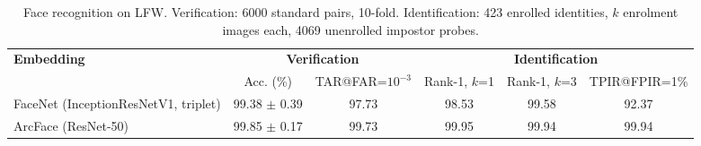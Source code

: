 \begin{table}[H]
\caption{Face recognition on LFW. Verification: 6000 standard pairs, 10-fold. Identification: 423 enrolled identities, $k$ enrolment images each, 4069 unenrolled impostor probes.}
\centering
\label{tab:att_lfw}
\begin{adjustbox}{max width=\textwidth}
\begin{tabular}{lccccc}
\toprule
\multirow{2}{*}{\bf Embedding} & \multicolumn{2}{c}{\bf Verification} & \multicolumn{3}{c}{\bf Identification} \\
\cmidrule(lr){2-3} \cmidrule(lr){4-6}
 & Acc. (\%) & TAR@FAR=$10^{-3}$ & Rank-1, $k$=1 & Rank-1, $k$=3 & TPIR@FPIR=1\% \\
\midrule
FaceNet (InceptionResNetV1, triplet) & 99.38 $\pm$ 0.39 & 97.73 & 98.53 & 99.58 & 92.37 \\
ArcFace (ResNet-50) & 99.85 $\pm$ 0.17 & 99.73 & 99.95 & 99.94 & 99.94 \\
\bottomrule
\end{tabular}
\end{adjustbox}
\end{table}
